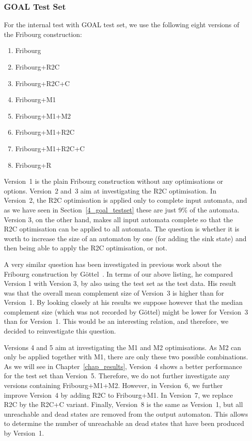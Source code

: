 \subsubsection{GOAL Test Set}
For the internal test with GOAL test set, we use the following eight versions of the Fribourg construction:
\begin{enumerate}
\item Fribourg
\item Fribourg+R2C
\item Fribourg+R2C+C
\item Fribourg+M1
\item Fribourg+M1+M2
\item Fribourg+M1+R2C
\item Fribourg+M1+R2C+C
\item Fribourg+R
\end{enumerate}

Version~1 is the plain Fribourg construction without any optimisations or options. Version~2 and~3 aim at investigating the R2C optimisation. In Version~2, the R2C optimisation is applied only to complete input automata, and as we have seen in Section~\ref{4_goal_testset} these are just 9\% of the automata. Version 3, on the other hand, makes all input automata complete so that the R2C optimisation can be applied to all automata. The question is whether it is worth to increase the size of an automaton by one (for adding the sink state) and then being able to apply the R2C optimisation, or not.

A very similar question has been investigated in previous work about the Fribourg construction by Göttel~\cite{2013_bsc_goettel}. In terms of our above listing, he compared Version 1 with Version 3, by also using the \goal{} test set as the test data. His result was that the overall mean complement size of Version~3 is higher than for Version~1. By looking closely at his results we suppose however that the median complement size (which was not recorded by Göttel) might be lower for Version~3 than for Version~1. This would be an interesting relation, and therefore, we decided to reinvestigate this question. 

Versions 4 and 5 aim at investigating the M1 and M2 optimisations. As M2 can only be applied together with M1, there are only these two possible combinations. As we will see in Chapter~\ref{chap_results}, Version~4 shows a better performance for the \goal{} test set than Version~5. Therefore, we do not further investigate any versions containing Fribourg+M1+M2. However, in Version~6, we further improve Version~4 by adding R2C to Fribourg+M1. In Version~7, we replace R2C by the R2C+C variant. Finally, Version~8 is the same as Version~1, but all unreachable and dead states are removed from the output automaton. This allows to determine the number of unreachable an dead states that have been produced by Version~1.

